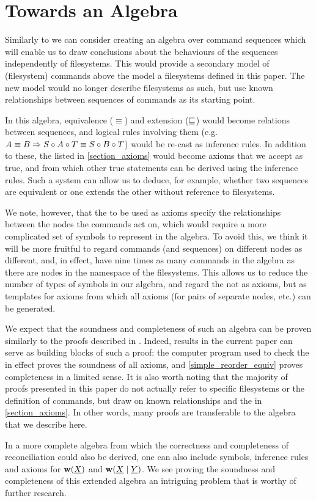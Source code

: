 
\section{Towards an Algebra}\label{sec_algebra}

Similarly to \cite{NREC} we can consider creating an algebra over command sequences
which will enable us to draw conclusions about the behaviours of the sequences
independently of filesystems.
This would provide a secondary model of (filesystem) commands above the model a filesystems
defined in this paper. The new model would no longer describe filesystems as such,
but use known relationships between sequences of commands as its starting point.

In this algebra, equivalence ($\equiv$) and extension ($\sqsubseteq$) would become relations
between sequences, and logical rules involving them
(e.g. $ A\equiv B \Rightarrow S\circ A\circ T\equiv S\circ B\circ T $) would be re-cast as inference rules.
In addition to these, the  listed in \cref{section_axioms}
would become axioms that we accept as true, and from which other true statements can be derived
using the inference rules.
Such a system can allow us to deduce, for example, whether two sequences are equivalent
or one extends the other
without reference to filesystems.

We note, however, that the  to be used as axioms 
specify the relationships between the nodes
the commands act on, which would require a more complicated set of symbols to represent
in the algebra.
To avoid this, we think it will be more fruitful to regard commands (and sequences)
on different nodes as different, and, in effect, have nine times as many commands 
in the algebra as there are nodes in the namespace of the filesystems.
This allows us to reduce the number of types of symbols in our algebra, and regard
the  not as axioms, but as templates for axioms
from which all axioms (for pairs of separate nodes, etc.) can be generated.

We expect that the soundness and completeness of such an algebra can be proven
similarly to the proofs described in \cite{NREC}.
Indeed, results in the current paper can serve as building blocks of such a proof:
the computer program used to check the 
in effect proves the soundness of all axioms,
and \cref{simple_reorder_equiv} proves completeness in a limited sense.
It is also worth noting that the majority of proofs presented in this paper
do not actually refer to specific filesystems or the definition of commands,
but draw on known relationships and the
 in \cref{section_axioms}.
In other words, many proofs are transferable to the algebra that we describe here.

In a more complete algebra from which the correctness and completeness
of reconciliation could also be derived,
one can also include symbols, inference rules and axioms for 
$\mathbf{w}({\underline{X}})$ and $\mathbf{w}({\underline{X}}\mathrel{|}{\underline{Y}})$.
We see proving the soundness and completeness of this extended algebra
an intriguing problem that is worthy of further research.
